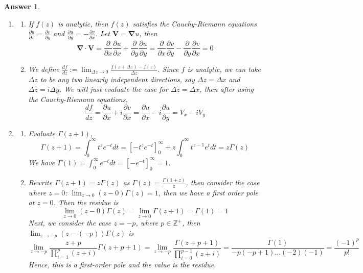 \documentclass[a4paper]{article}
\newtheorem{ans}{Answer}[section]
\theoremstyle{new}
\begin{document}
\begin{ans}\leavevmode
\begin{enumerate}[label=(\roman*)]
\item 
\begin{enumerate}[label=(\alph*)]
\item If $f(z)$ is analytic, then $f(z)$ satisfies the Cauchy-Riemann equations $\frac{\partial u}{\partial x}=\frac{\partial v}{\partial y}$ and $\frac{\partial u}{\partial y}=-\frac{\partial v}{\partial x}$. Let $\mathbf{V}=\boldsymbol{\nabla}u$, then 
$$\boldsymbol{\nabla}\cdot\mathbf{V}=\frac{\partial}{\partial x}\frac{\partial u}{\partial x}+\frac{\partial}{\partial y}\frac{\partial u}{\partial y}=\frac{\partial}{\partial x}\frac{\partial v}{\partial y}-\frac{\partial}{\partial y}\frac{\partial v}{\partial x}=0$$
\item We define $\frac{df}{dz}:=\lim_{\Delta z\rightarrow 0}\frac{f(z+\Delta z)-f(z)}{\Delta z}$. Since $f$ is analytic, we can take $\Delta z$ to be any two linearly independent directions, say $\Delta z=\Delta x$ and $\Delta z=i\Delta y$. We will just evaluate the case for $\Delta z=\Delta x$, then after using the Cauchy-Riemann equations,
$$\frac{df}{dz}=\frac{\partial u}{\partial x}+i\frac{\partial v}{\partial x}=\frac{\partial u}{\partial x}-i\frac{\partial u}{\partial y}=V_x-iV_y$$
\end{enumerate}
\item 
\begin{enumerate}[label=(\alph*)]
\item Evaluate $\Gamma(z+1)$,
$$\Gamma(z+1)=\int_0^\infty t^ze^{-t}dt=[-t^ze^{-t}]_0^\infty +z\int_0^\infty t^{z-1}e^tdt=z\Gamma(z)$$
We have $\Gamma(1)=\int_0^\infty e^{-t}dt=[-e^{-t}]_0^\infty=1$.
\item Rewrite $\Gamma(z+1)=z\Gamma(z)$ as $\Gamma(z)=\frac{\Gamma(1+z)}{z}$, then consider the case where $z=0$: $\lim_{z\rightarrow0}(z-0)\Gamma(z)=1$, then we have a first order pole at $z=0$. Then the residue is 
$$\lim_{z\rightarrow 0}(z-0)\Gamma(z)=\lim_{z\rightarrow 0}\Gamma(z+1)=\Gamma(1)=1$$
Next, we consider the case $z=-p$, where $p\in\mathbb{Z}^+$, then  
$\lim_{z\rightarrow -p}(z-(-p))\Gamma(z)$ is
$$\lim_{z\rightarrow -p}\frac{z+p}{\prod_{i=1}^p(z+i)}\Gamma(z+p+1)=\lim_{z\rightarrow -p}\frac{\Gamma(z+p+1)}{\prod_{i=0}^{p-1}(z+i)}=\frac{\Gamma(1)}{-p(-p+1)...(-2)(-1)}=\frac{(-1)^p}{p!}$$
Hence, this is a first-order pole and the value is the residue.
\end{enumerate}
\end{enumerate}
\end{ans}
\end{document}
